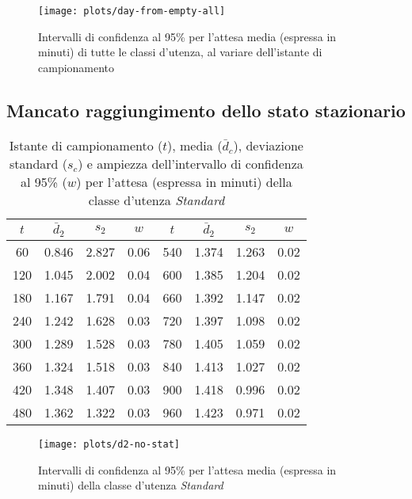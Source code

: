 \captionsetup[figure]{justification=centering}
\begin{figure}[ht]
\centering
\texttt{[image: plots/day-from-empty-all]}
\caption{Intervalli di confidenza al 95\% per l'attesa media (espressa in minuti) di tutte le classi d'utenza, al variare dell'istante di campionamento}
\label{fig:esperimenti-simulazione-3}
\end{figure}

\subsection*{Mancato raggiungimento dello stato stazionario}
\captionsetup[table]{justification=centering}
\begin{table}[ht]
\centering
{\tablecolors
\begin{tabular}{|c|c|c|c||c|c|c|c|}
\hline
$t$ & $\bar{d}_2$ & $s_2$ & $w$ & $t$ & $\bar{d}_2$ & $s_2$ & $w$ \\
\hline
60 & 0.846 & 2.827 & 0.06 & 540 & 1.374 & 1.263 & 0.02 \\
\hline
120 & 1.045 & 2.002 & 0.04 & 600 & 1.385 & 1.204 & 0.02 \\
\hline
180 & 1.167 & 1.791 & 0.04 & 660 & 1.392 & 1.147 & 0.02 \\
\hline
240 & 1.242 & 1.628 & 0.03 & 720 & 1.397 & 1.098 & 0.02 \\
\hline
300 & 1.289 & 1.528 & 0.03 & 780 & 1.405 & 1.059 & 0.02 \\
\hline
360 & 1.324 & 1.518 & 0.03 & 840 & 1.413 & 1.027 & 0.02 \\
\hline
420 & 1.348 & 1.407 & 0.03 & 900 & 1.418 & 0.996 & 0.02 \\
\hline
480 & 1.362 & 1.322 & 0.03 & 960 & 1.423 & 0.971 & 0.02 \\
\hline
\end{tabular}}
\caption{Istante di campionamento ($t$), media ($\bar{d}_c$), deviazione standard ($s_c$) e ampiezza dell'intervallo di confidenza al 95\% ($w$) per l'attesa (espressa in minuti) della classe d'utenza \uo{} \textsl{Standard}}
\end{table}

\captionsetup[figure]{justification=centering}
\begin{figure}[ht!]
\centering
\texttt{[image: plots/d2-no-stat]}
\caption{Intervalli di confidenza al 95\% per l'attesa media (espressa in minuti) della classe d'utenza \uo{} \textsl{Standard}}
\label{fig:esperimenti-simulazione-4}
\end{figure}